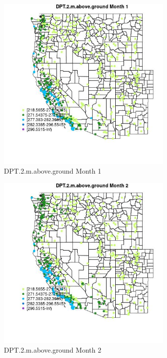 \begin{figure} 
\centering  
\includegraphics[width=0.77\textwidth]{Code_Outputs/Report_ML_input_PM25_Step4_part_e_de_duplicated_aves_compiled_2019-05-14wNAs_MapObsMo1DPT2maboveground.jpg} 
\caption{\label{fig:Report_ML_input_PM25_Step4_part_e_de_duplicated_aves_compiled_2019-05-14wNAsMapObsMo1DPT2maboveground}DPT.2.m.above.ground Month 1} 
\end{figure} 
 

\clearpage 

\begin{figure} 
\centering  
\includegraphics[width=0.77\textwidth]{Code_Outputs/Report_ML_input_PM25_Step4_part_e_de_duplicated_aves_compiled_2019-05-14wNAs_MapObsMo2DPT2maboveground.jpg} 
\caption{\label{fig:Report_ML_input_PM25_Step4_part_e_de_duplicated_aves_compiled_2019-05-14wNAsMapObsMo2DPT2maboveground}DPT.2.m.above.ground Month 2} 
\end{figure} 
 

